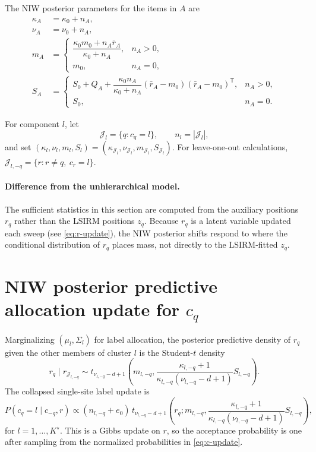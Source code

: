 \documentclass[11pt]{article}
\newcommand{\trans}{^{\mathsf T}}
\begin{document}
The NIW posterior parameters for the items in $A$ are
\begin{align}
    \kappa_A &= \kappa_0+n_A,\\
    \nu_A &= \nu_0+n_A,\\
    m_A &=
    \begin{cases}
    \dfrac{\kappa_0m_0+n_A\bar r_A}{\kappa_0+n_A}, & n_A>0,\\[1em]
    m_0, & n_A=0,
    \end{cases}\\
    S_A &=
    \begin{cases}
    S_0+Q_A+\dfrac{\kappa_0 n_A}{\kappa_0+n_A}(\bar r_A-m_0)(\bar r_A-m_0)\trans,
    & n_A>0,\\[1em]
    S_0, & n_A=0.
    \end{cases}
    \label{eq:niw-posterior-params}
\end{align}

For component $l$, let
\[
    \mathcal J_l=\{q:c_q=l\},
    \qquad n_l=|\mathcal J_l|,
\]
and set $(\kappa_l,\nu_l,m_l,S_l)=(\kappa_{\mathcal J_l},\nu_{\mathcal J_l},m_{\mathcal J_l},S_{\mathcal J_l})$.
For leave-one-out calculations, $\mathcal J_{l,-q}=\{r:r\neq q,\ c_r=l\}$.

\paragraph{Difference from the unhierarchical model.}
The sufficient statistics in this section are computed from the auxiliary
positions $r_q$ rather than the LSIRM positions $z_q$.  Because $r_q$ is a
latent variable updated each sweep (see \eqref{eq:r-update}), the NIW
posterior shifts respond to where the conditional distribution of $r_q$
places mass, not directly to the LSIRM-fitted $z_q$.

\section{NIW posterior predictive allocation update for $c_q$}

Marginalizing $(\mu_l,\Sigma_l)$ for label allocation, the posterior
predictive density of $r_q$ given the other members of cluster $l$ is the
Student-$t$ density
\begin{equation}
    r_q\mid r_{\mathcal J_{l,-q}}
    \sim
    t_{\nu_{l,-q}-d+1}
    \!\left(
    m_{l,-q},
    \frac{\kappa_{l,-q}+1}{\kappa_{l,-q}(\nu_{l,-q}-d+1)}S_{l,-q}
    \right).
    \label{eq:niw-predictive}
\end{equation}
The collapsed single-site label update is
\begin{equation}
    P(c_q=l\mid c_{-q},r)
    \propto
    (n_{l,-q}+e_0)\,
    t_{\nu_{l,-q}-d+1}
    \!\left(
    r_q;
    m_{l,-q},
    \frac{\kappa_{l,-q}+1}{\kappa_{l,-q}(\nu_{l,-q}-d+1)}S_{l,-q}
    \right),
    \label{eq:c-update}
\end{equation}
for $l=1,\dots,K^\star$.  This is a Gibbs update on $r$, so the acceptance
probability is one after sampling from the normalized probabilities in
\eqref{eq:c-update}.
\end{document}
